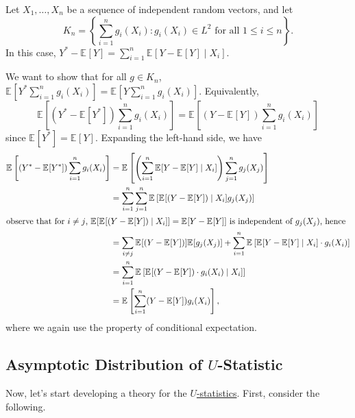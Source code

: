 \begin{eg}\label{eg:projection}
	Let \(X_1, \dots , X_n\) be a sequence of independent random vectors, and let
	\[
		K_n = \left\{ \sum_{i=1}^{n} g_i(X_i) \colon g_i(X_i) \in L^2 \text{ for all } 1 \leq i \leq n \right\}.
	\]
	In this case, \(Y^{\ast} - \mathbb{E}_{}[Y] = \sum_{i=1}^{n} \mathbb{E}_{}[Y - \mathbb{E}_{}[Y] \mid X_i] \).
\end{eg}
\begin{explanation}
	We want to show that for all \(g \in K_n\), \(\mathbb{E}_{}[Y^{\ast} \sum_{i=1}^{n} g_i(X_i)] = \mathbb{E}_{}[Y \sum_{i=1}^{n} g_i(X_i)] \). Equivalently,
	\[
		\mathbb{E}_{}\left[(Y^{\ast} - \mathbb{E}_{}[Y^{\ast} ] ) \sum_{i=1}^{n} g_i(X_i)\right]
		= \mathbb{E}_{}\left[(Y - \mathbb{E}_{}[Y] ) \sum_{i=1}^{n} g_i(X_i)\right]
	\]
	since \(\mathbb{E}_{}[Y^{\ast} ] = \mathbb{E}_{}[Y] \). Expanding the left-hand side, we have
	\begin{align*}
		\mathbb{E}_{}\left[(Y^{\ast} - \mathbb{E}_{}[Y^{\ast} ] ) \sum_{i=1}^{n} g_i(X_i)\right]
		 & = \mathbb{E}_{}\left[\left( \sum_{i=1}^{n} \mathbb{E}_{}[Y - \mathbb{E}_{}[Y] \mid X_i] \right) \sum_{j=1}^{n} g_j(X_j)\right]                                                            \\
		 & = \sum_{i=1}^{n} \sum_{j=1}^{n} \mathbb{E}_{}\left[\mathbb{E}_{}[(Y - \mathbb{E}_{}[Y] ) \mid X_i] g_j(X_j) \right]                                                                       \\
		\shortintertext{observe that for \(i\neq j\), \(\mathbb{E}_{}[\mathbb{E}_{}[(Y - \mathbb{E}_{}[Y] ) \mid X_i ]] = \mathbb{E}_{}[Y - \mathbb{E}_{}[Y] ] \) is independent of \(g_j(X_j)\), hence}
		 & = \sum_{i \neq j} \mathbb{E}_{}[(Y - \mathbb{E}_{}[Y] ) ] \mathbb{E}_{}[g_j(X_j) ] + \sum_{i=1}^{n} \mathbb{E}_{}\left[\mathbb{E}_{}[Y - \mathbb{E}_{}[Y] \mid X_i] \cdot g_i(X_i)\right] \\
		 & =  \sum_{i=1}^{n} \mathbb{E}_{}\left[\mathbb{E}_{}[(Y - \mathbb{E}_{}[Y]) \cdot g_i(X_i) \mid X_i]\right]                                                                                 \\
		 & = \mathbb{E}_{}\left[\sum_{i=1}^{n} (Y - \mathbb{E}_{}[Y] ) g_i(X_i) \right],
	\end{align*}
	where we again use the property of conditional expectation.
\end{explanation}

\subsection{Asymptotic Distribution of \(U\)-Statistic}
Now, let's start developing a theory for the \hyperref[def:U-statistic]{\(U\)-statistics}. First, consider the following.

